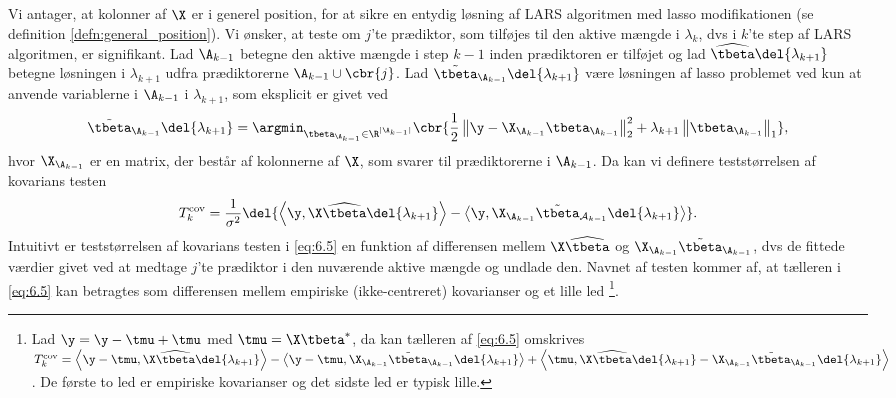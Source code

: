Vi antager, at kolonner af \(\X\) er i generel position, for at sikre en entydig løsning af LARS algoritmen med lasso modifikationen (se definition \ref{defn:general_position}).
%
Vi ønsker, at teste om \(j\)'te prædiktor, som tilføjes til den aktive mængde i \(\lambda_k\), dvs i \(k\)'te step af LARS algoritmen, er signifikant.
Lad \(\A_{k-1}\) betegne den aktive mængde i step \(k-1\) inden prædiktoren er tilføjet og lad \(\widehat{\tbeta} \del{\lambda_{k+1}}\) betegne løsningen i \(\lambda_{k+1}\) udfra prædiktorerne \(\A_{k-1} \cup \cbr{j}\).
Lad \(\tilde{\tbeta}_{\A_{k-1}} \del{\lambda_{k+1}}\) være løsningen af lasso problemet ved kun at anvende variablerne i \(\A_{k-1}\) i \(\lambda_{k+1}\), som eksplicit er givet ved 
\begin{align*}
\tilde{\tbeta}_{\A_{k-1}} \del{\lambda_{k+1}} = \argmin_{\tbeta_{\A_{k-1}} \in \R^{\vert \A_{k-1} \vert}} \cbr{\frac{1}{2} \left\Vert \y - \X_{\A_{k-1}} \tbeta_{\A_{k-1}} \right\Vert_2^2 + \lambda_{k+1} \left\Vert \tbeta_{\A_{k-1}} \right\Vert_1},
\end{align*}
hvor \(\X_{\A_{k-1}}\) er en matrix, der består af kolonnerne af \(\X\), som svarer til prædiktorerne i \(\A_{k-1}\).
Da kan vi definere teststørrelsen af kovarians testen
\begin{align}
T_k^\text{cov} = \frac{1}{\sigma^2} \del{ \left\langle \y, \X \widehat{\tbeta} \del{\lambda_{k+1}} \right\rangle - \left\langle  \y, \X_{\A_{k-1}} \tilde{\tbeta}_{\mathcal{A}_{k-1}} \del{\lambda_{k+1}} \right\rangle}. \label{eq:6.5}
\end{align}
Intuitivt er teststørrelsen af kovarians testen i \eqref{eq:6.5} en funktion af differensen mellem \(\X \widehat{\tbeta}\) og \(\X_{\A_{k-1}} \tilde{\tbeta}_{\A_{k-1}}\), dvs de fittede værdier givet ved at medtage \(j\)'te prædiktor i den nuværende aktive mængde og undlade den.
Navnet af testen kommer af, at tælleren i \eqref{eq:6.5} kan betragtes som differensen mellem empiriske (ikke-centreret) kovarianser og et lille led 
\footnote{Lad \(\y = \y - \tmu + \tmu\) med \(\tmu = \X \tbeta^*\), da kan tælleren af \eqref{eq:6.5} omskrives \(T_k^\text{cov} = \left\langle \y - \tmu, \X \widehat{\tbeta} \del{\lambda_{k+1}} \right\rangle - \left\langle \y - \tmu, \X_{\A_{k-1}} \tilde{\tbeta}_{\A_{k-1}} \del{\lambda_{k+1}} \right\rangle + \left\langle \tmu, \X \widehat{\tbeta} \del{\lambda_{k+1}} - \X_{\A_{k-1}} \tilde{\tbeta}_{\A_{k-1}} \del{\lambda_{k+1}} \right\rangle\).
De første to led er empiriske kovarianser og det sidste led er typisk lille.}.
